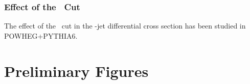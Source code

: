\subsubsection{Effect of the \ptd\ Cut}
The effect of the \ptd\ cut in the \Dstar-jet differential cross section has been studied in POWHEG+PYTHIA6.


\section{Preliminary Figures}


{}


